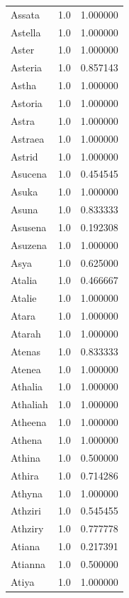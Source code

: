 \documentclass[
  letterpaper,
  DIV=11,
  numbers=noendperiod]{scrreprt}
\begin{document}
\begin{tabular}{lrr}
Assata          &   1.0 &   1.000000 \\
Astella         &   1.0 &   1.000000 \\
Aster           &   1.0 &   1.000000 \\
Asteria         &   1.0 &   0.857143 \\
Astha           &   1.0 &   1.000000 \\
Astoria         &   1.0 &   1.000000 \\
Astra           &   1.0 &   1.000000 \\
Astraea         &   1.0 &   1.000000 \\
Astrid          &   1.0 &   1.000000 \\
Asucena         &   1.0 &   0.454545 \\
Asuka           &   1.0 &   1.000000 \\
Asuna           &   1.0 &   0.833333 \\
Asusena         &   1.0 &   0.192308 \\
Asuzena         &   1.0 &   1.000000 \\
Asya            &   1.0 &   0.625000 \\
Atalia          &   1.0 &   0.466667 \\
Atalie          &   1.0 &   1.000000 \\
Atara           &   1.0 &   1.000000 \\
Atarah          &   1.0 &   1.000000 \\
Atenas          &   1.0 &   0.833333 \\
Atenea          &   1.0 &   1.000000 \\
Athalia         &   1.0 &   1.000000 \\
Athaliah        &   1.0 &   1.000000 \\
Atheena         &   1.0 &   1.000000 \\
Athena          &   1.0 &   1.000000 \\
Athina          &   1.0 &   0.500000 \\
Athira          &   1.0 &   0.714286 \\
Athyna          &   1.0 &   1.000000 \\
Athziri         &   1.0 &   0.545455 \\
Athziry         &   1.0 &   0.777778 \\
Atiana          &   1.0 &   0.217391 \\
Atianna         &   1.0 &   0.500000 \\
Atiya           &   1.0 &   1.000000 \\

\end{tabular}
\end{document}
